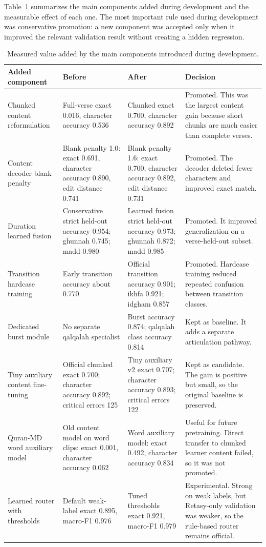 \documentclass[12pt,a4paper]{report}
\begin{document}
Table~\ref{tab:added_components_ablation} summarizes the main components added
during development and the measurable effect of each one. The most important
rule used during development was conservative promotion: a new component was
accepted only when it improved the relevant validation result without creating a
hidden regression.

\begin{table}[H]
\centering
\small
\begin{tabularx}{\textwidth}{p{} p{} p{} X}
\toprule
\textbf{Added component} & \textbf{Before} & \textbf{After} & \textbf{Decision} \\
\midrule
Chunked content reformulation &
Full-verse exact 0.016, character accuracy 0.536 &
Chunked exact 0.700, character accuracy 0.892 &
Promoted. This was the largest content gain because short chunks are much
easier than complete verses. \\
\midrule
Content decoder blank penalty &
Blank penalty 1.0: exact 0.691, character accuracy 0.890, edit distance 0.741 &
Blank penalty 1.6: exact 0.700, character accuracy 0.892, edit distance 0.731 &
Promoted. The decoder deleted fewer characters and improved exact match. \\
\midrule
Duration learned fusion &
Conservative strict held-out accuracy 0.954; ghunnah 0.745; madd 0.980 &
Learned fusion strict held-out accuracy 0.973; ghunnah 0.872; madd 0.985 &
Promoted. It improved generalization on a verse-held-out subset. \\
\midrule
Transition hardcase training &
Early transition accuracy about 0.770 &
Official transition accuracy 0.901; ikhfa 0.921; idgham 0.857 &
Promoted. Hardcase training reduced repeated confusion between transition
classes. \\
\midrule
Dedicated burst module &
No separate qalqalah specialist &
Burst accuracy 0.874; qalqalah class accuracy 0.814 &
Kept as baseline. It adds a separate articulation pathway. \\
\midrule
Tiny auxiliary content fine-tuning &
Official chunked exact 0.700; character accuracy 0.892; critical errors 125 &
Tiny auxiliary v2 exact 0.707; character accuracy 0.893; critical errors 122 &
Kept as candidate. The gain is positive but small, so the original baseline is
preserved. \\
\midrule
Quran-MD word auxiliary model &
Old content model on word clips: exact 0.001, character accuracy 0.062 &
Word auxiliary model: exact 0.492, character accuracy 0.834 &
Useful for future pretraining. Direct transfer to chunked learner content failed,
so it was not promoted. \\
\midrule
Learned router with thresholds &
Default weak-label exact 0.895, macro-F1 0.976 &
Tuned thresholds exact 0.921, macro-F1 0.979 &
Experimental. Strong on weak labels, but Retasy-only validation was weaker, so
the rule-based router remains official. \\
\bottomrule
\end{tabularx}
\caption{Measured value added by the main components introduced during development.}
\label{tab:added_components_ablation}
\end{table}
\end{document}

